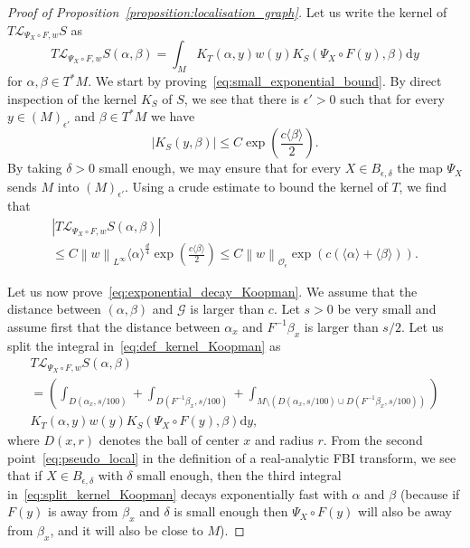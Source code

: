 \documentclass[AHL,Unicode,longabstracts,published]{cedram}
\newcommand{\p}[1]{\left(#1\right)}
\newcommand{\n}[1]{\left\|#1\right\|}
\newcommand{\va}[1]{\left|#1\right|}
\newcommand{\brac}[1]{\langle #1 \rangle}
\newcommand{\clO}{\mathcal{O}}
\newcommand{\clL}{\mathcal{L}}
\newcommand{\clG}{\mathcal{G}}
\newcommand{\rmd}{\mathrm{d}}
\newcommand{\clO}{\mathcal{O}}
\begin{document}
\begin{proof}[Proof of Proposition~\ref{proposition:localisation_graph}]
Let us write the kernel of $T\clL_{\Psi_X \circ F, w} S$ as
\begin{equation}\label{eq:def_kernel_Koopman}
T\clL_{\Psi_X \circ F, w} S(\alpha,\beta) = \int_M K_T(\alpha,y) w(y) K_S(\Psi_X \circ F(y),\beta) \rmd y
\end{equation}
for $\alpha,\beta \in T^* M$. We start by proving~\eqref{eq:small_exponential_bound}. By direct inspection of the kernel $K_S$ of $S$, we see that there is $\epsilon' > 0$ such that for every $y \in (M)_{\epsilon'}$ and $\beta \in T^* M$ we have
\begin{equation*}
\va{K_S(y,\beta)} \leq C \exp\p{\frac{c \brac{\beta}}{2}}.
\end{equation*}
By taking $\delta > 0$ small enough, we may ensure that for every $X \in B_{\epsilon,\delta}$ the map $\Psi_X$ sends $M$ into $(M)_{\epsilon'}$. Using a crude estimate to bound the kernel of $T$, we find that
\begin{multline*}
 \va{T\clL_{\Psi_X \circ F, w} S(\alpha,\beta)} \\ 
\leq C \n{w}_{L^\infty} \brac{\alpha}^{\frac{d}{4}} \exp\p{\frac{c \brac{\beta}}{2}} \leq C \n{w}_{\clO_\epsilon} \exp\p{c (\brac{\alpha} + \brac{\beta})}.
\end{multline*}

Let us now prove~\eqref{eq:exponential_decay_Koopman}. We assume that the distance between $(\alpha,\beta)$ and $\clG$ is larger than $c$. Let $s > 0$ be very small and assume first that the distance between $\alpha_x$ and $F^{-1} \beta_x$ is larger than $s/2$. Let us split the integral in~\eqref{eq:def_kernel_Koopman} as
\begin{multline}\label{eq:split_kernel_Koopman}
 T\clL_{\Psi_X \circ F, w} S(\alpha,\beta) \\
= \p{\int_{D(\alpha_x,s/100)} + \int_{D\left(F^{-1} \beta_x,s/100\right)} + \int_{M \setminus \p{D(\alpha_x,s/100) \cup D\left(F^{-1} \beta_x,s/100\right)}}} \\
 K_T(\alpha,y) w(y) K_S(\Psi_X \circ F(y),\beta) \rmd y,
\end{multline}
where $D(x,r)$ denotes the ball of center $x$ and radius $r$. From the second point~\eqref{eq:pseudo_local} in the definition of a real-analytic FBI transform, we see that if $X \in B_{\epsilon,\delta}$ with $\delta$ small enough, then the third integral in~\eqref{eq:split_kernel_Koopman} decays exponentially fast with $\alpha$ and $\beta$ (because if $F(y)$ is away from $\beta_x$ and $\delta$ is small enough then $\Psi_X \circ F(y)$ will also be away from $\beta_x$, and it will also be close to $M$).


\end{proof}
\end{document}
